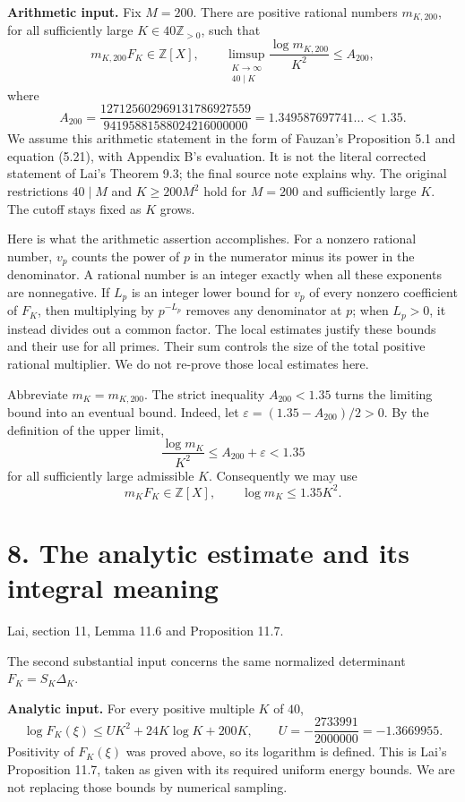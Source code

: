 \documentclass[11pt]{article}
\newcommand{\Z}{\mathbb Z}
\newcommand{\source}[1]{{\small\color{blue!45!black}#1}\par}
\newcommand{\heading}[2]{\section*{#1}\source{#2}}
\begin{document}
\textbf{Arithmetic input.} Fix $M=200$. There are positive rational
numbers $m_{K,200}$, for all sufficiently large $K\in40\Z_{>0}$, such that
\begin{equation}\label{eq:arith-input}
 m_{K,200}F_K\in\Z[X],\qquad
 \limsup_{\substack{K\to\infty\\40\mid K}}
 \frac{\log m_{K,200}}{K^2}\leq A_{200},
\end{equation}
where
\[
 A_{200}=\frac{127125602969131786927559}
                 {94195881588024216000000}
        =1.349587697741\ldots<1.35.
\]
We assume this arithmetic statement in the form of Fauzan's Proposition 5.1
and equation (5.21), with Appendix B's evaluation. It is not the literal
corrected statement of Lai's Theorem 9.3; the final source note explains why.
The original restrictions $40\mid M$ and $K\geq200M^2$ hold for $M=200$
and sufficiently large $K$. The cutoff stays fixed as $K$ grows.

Here is what the arithmetic assertion accomplishes. For a nonzero rational
number, $v_p$ counts the power of $p$ in the numerator minus its power in
the denominator. A rational number is an integer exactly when all these
exponents are nonnegative. If $L_p$ is an integer lower bound for $v_p$ of
every nonzero coefficient of $F_K$, then multiplying by $p^{-L_p}$ removes
any denominator at $p$; when $L_p>0$, it instead divides out a common factor.
The local estimates justify these bounds and their use for all primes.
Their sum controls the size of the total positive rational multiplier.
We do not re-prove those local estimates here.

Abbreviate $m_K=m_{K,200}$. The strict inequality $A_{200}<1.35$ turns the
limiting bound into an eventual bound. Indeed, let
$\varepsilon=(1.35-A_{200})/2>0$. By the definition of the upper limit,
\[
 \frac{\log m_K}{K^2}\leq A_{200}+\varepsilon<1.35
\]
for all sufficiently large admissible $K$. Consequently we may use
\begin{equation}\label{eq:arith-rounded}
 \boxed{m_KF_K\in\Z[X],\qquad \log m_K\leq1.35K^2.}
\end{equation}

\newpage
\heading{8. The analytic estimate and its integral meaning}{Lai, section 11, Lemma 11.6 and Proposition 11.7.}
The second substantial input concerns the same normalized determinant
$F_K=S_K\Delta_K$.

\textbf{Analytic input.} For every positive multiple $K$ of $40$,
\begin{equation}\label{eq:analytic-input}
 \log F_K(\xi)\leq UK^2+24K\log K+200K,
 \qquad U=-\frac{2733991}{2000000}=-1.3669955.
\end{equation}
Positivity of $F_K(\xi)$ was proved above, so its logarithm is defined.
This is Lai's Proposition 11.7, taken as given with its required uniform
energy bounds. We are not replacing those bounds by numerical sampling.
\end{document}
